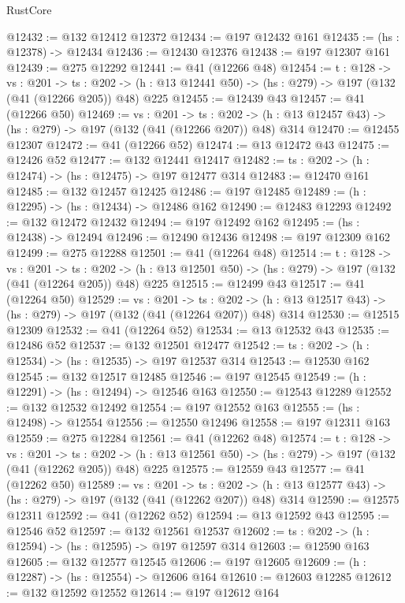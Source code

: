 \begin{lexlean}{RustCore}
\begin{coremodule}
@12432 := @132 @12412 @12372
@12434 := @197 @12432 @161
@12435 := (hs : @12378) -> @12434
@12436 := @12430 @12376
@12438 := @197 @12307 @161
@12439 := @275 @12292
@12441 := @41 (@12266 @48)
@12454 := {t : @128} ->
  {vs : @201} ->
  {ts : @202} -> (h : @13 @12441 @50) -> (hs : @279) -> @197 (@132 (@41 (@12266 @205)) @48) @225
@12455 := @12439 @43
@12457 := @41 (@12266 @50)
@12469 := {vs : @201} ->
  {ts : @202} -> (h : @13 @12457 @43) -> (hs : @279) -> @197 (@132 (@41 (@12266 @207)) @48) @314
@12470 := @12455 @12307
@12472 := @41 (@12266 @52)
@12474 := @13 @12472 @43
@12475 := @12426 @52
@12477 := @132 @12441 @12417
@12482 := {ts : @202} -> (h : @12474) -> (hs : @12475) -> @197 @12477 @314
@12483 := @12470 @161
@12485 := @132 @12457 @12425
@12486 := @197 @12485
@12489 := (h : @12295) -> (hs : @12434) -> @12486 @162
@12490 := @12483 @12293
@12492 := @132 @12472 @12432
@12494 := @197 @12492 @162
@12495 := (hs : @12438) -> @12494
@12496 := @12490 @12436
@12498 := @197 @12309 @162
@12499 := @275 @12288
@12501 := @41 (@12264 @48)
@12514 := {t : @128} ->
  {vs : @201} ->
  {ts : @202} -> (h : @13 @12501 @50) -> (hs : @279) -> @197 (@132 (@41 (@12264 @205)) @48) @225
@12515 := @12499 @43
@12517 := @41 (@12264 @50)
@12529 := {vs : @201} ->
  {ts : @202} -> (h : @13 @12517 @43) -> (hs : @279) -> @197 (@132 (@41 (@12264 @207)) @48) @314
@12530 := @12515 @12309
@12532 := @41 (@12264 @52)
@12534 := @13 @12532 @43
@12535 := @12486 @52
@12537 := @132 @12501 @12477
@12542 := {ts : @202} -> (h : @12534) -> (hs : @12535) -> @197 @12537 @314
@12543 := @12530 @162
@12545 := @132 @12517 @12485
@12546 := @197 @12545
@12549 := (h : @12291) -> (hs : @12494) -> @12546 @163
@12550 := @12543 @12289
@12552 := @132 @12532 @12492
@12554 := @197 @12552 @163
@12555 := (hs : @12498) -> @12554
@12556 := @12550 @12496
@12558 := @197 @12311 @163
@12559 := @275 @12284
@12561 := @41 (@12262 @48)
@12574 := {t : @128} ->
  {vs : @201} ->
  {ts : @202} -> (h : @13 @12561 @50) -> (hs : @279) -> @197 (@132 (@41 (@12262 @205)) @48) @225
@12575 := @12559 @43
@12577 := @41 (@12262 @50)
@12589 := {vs : @201} ->
  {ts : @202} -> (h : @13 @12577 @43) -> (hs : @279) -> @197 (@132 (@41 (@12262 @207)) @48) @314
@12590 := @12575 @12311
@12592 := @41 (@12262 @52)
@12594 := @13 @12592 @43
@12595 := @12546 @52
@12597 := @132 @12561 @12537
@12602 := {ts : @202} -> (h : @12594) -> (hs : @12595) -> @197 @12597 @314
@12603 := @12590 @163
@12605 := @132 @12577 @12545
@12606 := @197 @12605
@12609 := (h : @12287) -> (hs : @12554) -> @12606 @164
@12610 := @12603 @12285
@12612 := @132 @12592 @12552
@12614 := @197 @12612 @164

\end{coremodule}
\end{lexlean}
